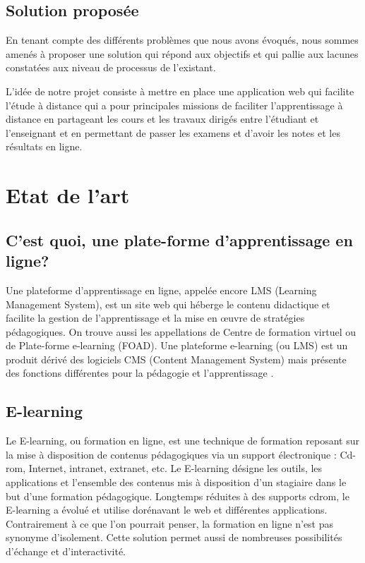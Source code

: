 \subsection{Solution proposée}
En tenant compte des différents problèmes que nous avons évoqués, nous sommes amenés à
proposer une solution qui répond aux objectifs et qui pallie aux lacunes constatées aux niveau
de processus de l’existant.

 L’idée de notre projet consiste à mettre en place une application
web qui facilite l’étude à distance qui a pour principales missions de faciliter l’apprentissage
à distance en partageant les cours et les travaux dirigés entre l’étudiant et l’enseignant et en
permettant de passer les examens et d’avoir les notes et les résultats en ligne. 
\section{ Etat de l’art}
\subsection{C'est quoi, une plate-forme d'apprentissage en ligne?}
Une plateforme d'apprentissage en ligne, appelée encore LMS (Learning Management System),
est un site web qui héberge le contenu didactique et facilite la gestion de l'apprentissage et la
mise en œuvre de stratégies pédagogiques. On trouve aussi les appellations de Centre de
formation virtuel ou de Plate-forme e-learning (FOAD). 
Une plateforme e-learning (ou LMS) est un produit dérivé des logiciels CMS (Content
Management System) mais présente des fonctions différentes pour la pédagogie et
l'apprentissage .
\subsection{E-learning }
Le E-learning, ou formation en ligne, est une technique de formation reposant sur la mise à
disposition de contenus pédagogiques via un support électronique : Cd-rom, Internet, intranet,
extranet, etc.
Le E-learning désigne les outils, les applications et l’ensemble des contenus mis à disposition
d’un stagiaire dans le but d’une formation pédagogique. Longtemps réduites à des supports cdrom, le E-learning a évolué et utilise dorénavant le web et différentes applications.
Contrairement à ce que l’on pourrait penser, la formation en ligne n’est pas synonyme
d’isolement. Cette solution permet aussi de nombreuses possibilités d’échange et d’interactivité.
\clearpage

